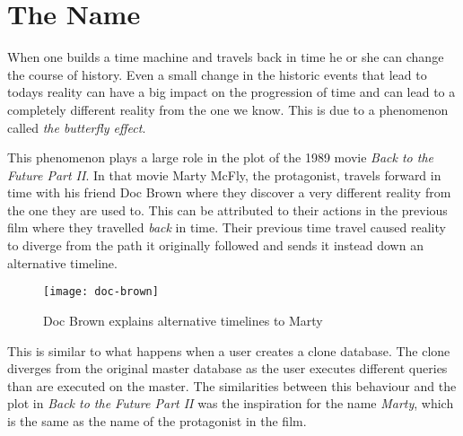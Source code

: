 \chapter{The Name}
When one builds a time machine and travels back in time he or she can change the course of history.
Even a small change in the historic events that lead to todays reality can have a big impact on the progression of time and can lead to a completely different reality from the one we know.
This is due to a phenomenon called \textit{the butterfly effect}.

This phenomenon plays a large role in the plot of the 1989 movie \textit{Back to the Future Part II}.
In that movie Marty McFly, the protagonist, travels forward in time with his friend Doc Brown where they discover a very different reality from the one they are used to.
This can be attributed to their actions in the previous film where they travelled \textit{back} in time.
Their previous time travel caused reality to diverge from the path it originally followed and sends it instead down an alternative timeline.

\begin{figure}[h!]
  \centering
    \texttt{[image: doc-brown]}
  \caption{Doc Brown explains alternative timelines to Marty}
  \label{fig:history-data-table}
\end{figure}

This is similar to what happens when a user creates a clone database.
The clone diverges from the original master database as the user executes different queries than are executed on the master.
The similarities between this behaviour and the plot in \textit{Back to the Future Part II} was the inspiration for the name \textit{Marty}, which is the same as the name of the protagonist in the film.